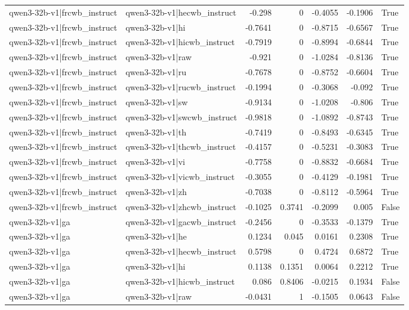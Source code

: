 \begin{table}
\begin{tabular}{l l r r r r l}
qwen3-32b-v1|frcwb_instruct & qwen3-32b-v1|hecwb_instruct & -0.298 & 0 & -0.4055 & -0.1906 & True \\
qwen3-32b-v1|frcwb_instruct & qwen3-32b-v1|hi & -0.7641 & 0 & -0.8715 & -0.6567 & True \\
qwen3-32b-v1|frcwb_instruct & qwen3-32b-v1|hicwb_instruct & -0.7919 & 0 & -0.8994 & -0.6844 & True \\
qwen3-32b-v1|frcwb_instruct & qwen3-32b-v1|raw & -0.921 & 0 & -1.0284 & -0.8136 & True \\
qwen3-32b-v1|frcwb_instruct & qwen3-32b-v1|ru & -0.7678 & 0 & -0.8752 & -0.6604 & True \\
qwen3-32b-v1|frcwb_instruct & qwen3-32b-v1|rucwb_instruct & -0.1994 & 0 & -0.3068 & -0.092 & True \\
qwen3-32b-v1|frcwb_instruct & qwen3-32b-v1|sw & -0.9134 & 0 & -1.0208 & -0.806 & True \\
qwen3-32b-v1|frcwb_instruct & qwen3-32b-v1|swcwb_instruct & -0.9818 & 0 & -1.0892 & -0.8743 & True \\
qwen3-32b-v1|frcwb_instruct & qwen3-32b-v1|th & -0.7419 & 0 & -0.8493 & -0.6345 & True \\
qwen3-32b-v1|frcwb_instruct & qwen3-32b-v1|thcwb_instruct & -0.4157 & 0 & -0.5231 & -0.3083 & True \\
qwen3-32b-v1|frcwb_instruct & qwen3-32b-v1|vi & -0.7758 & 0 & -0.8832 & -0.6684 & True \\
qwen3-32b-v1|frcwb_instruct & qwen3-32b-v1|vicwb_instruct & -0.3055 & 0 & -0.4129 & -0.1981 & True \\
qwen3-32b-v1|frcwb_instruct & qwen3-32b-v1|zh & -0.7038 & 0 & -0.8112 & -0.5964 & True \\
qwen3-32b-v1|frcwb_instruct & qwen3-32b-v1|zhcwb_instruct & -0.1025 & 0.3741 & -0.2099 & 0.005 & False \\
qwen3-32b-v1|ga & qwen3-32b-v1|gacwb_instruct & -0.2456 & 0 & -0.3533 & -0.1379 & True \\
qwen3-32b-v1|ga & qwen3-32b-v1|he & 0.1234 & 0.045 & 0.0161 & 0.2308 & True \\
qwen3-32b-v1|ga & qwen3-32b-v1|hecwb_instruct & 0.5798 & 0 & 0.4724 & 0.6872 & True \\
qwen3-32b-v1|ga & qwen3-32b-v1|hi & 0.1138 & 0.1351 & 0.0064 & 0.2212 & True \\
qwen3-32b-v1|ga & qwen3-32b-v1|hicwb_instruct & 0.086 & 0.8406 & -0.0215 & 0.1934 & False \\
qwen3-32b-v1|ga & qwen3-32b-v1|raw & -0.0431 & 1 & -0.1505 & 0.0643 & False \\

\end{tabular}
\end{table}
